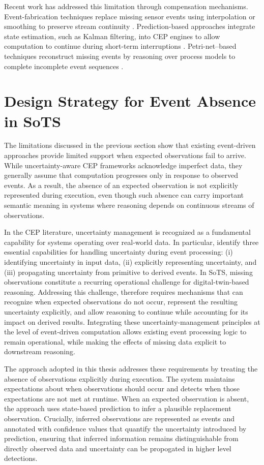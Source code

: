 Recent work has addressed this limitation through compensation mechanisms. Event-fabrication techniques replace missing sensor events using interpolation or smoothing to preserve stream continuity \citep{gkoulis2025assessing}. Prediction-based approaches integrate state estimation, such as Kalman filtering, into CEP engines to allow computation to continue during short-term interruptions \citep{vijayakumar2009missing}. Petri-net--based techniques reconstruct missing events by reasoning over process models to complete incomplete event sequences \citep{wang2013efficient}.


\section{Design Strategy for Event Absence in SoTS}
The limitations discussed in the previous section show that existing event-driven approaches provide limited support when expected observations fail to arrive. While uncertainty-aware CEP frameworks acknowledge imperfect data, they generally assume that computation progresses only in response to observed events. As a result, the absence of an expected observation is not explicitly represented during execution, even though such absence can carry important semantic meaning in systems where reasoning depends on continuous streams of observations.

In the CEP literature, uncertainty management is recognized as a fundamental capability for systems operating over real-world data. In particular, \citet{cugola2015complex} identify three essential capabilities for handling uncertainty during event processing: (i) identifying uncertainty in input data, (ii) explicitly representing uncertainty, and (iii) propagating uncertainty from primitive to derived events. In SoTS, missing observations constitute a recurring operational challenge for digital-twin-based reasoning. Addressing this challenge, therefore requires mechanisms that can recognize when expected observations do not occur, represent the resulting uncertainty explicitly, and allow reasoning to continue while accounting for its impact on derived results. Integrating these uncertainty-management principles at the level of event-driven computation allows existing event processing logic to remain operational, while making the effects of missing data explicit to downstream reasoning.


The approach adopted in this thesis addresses these requirements by treating the absence of observations explicitly during execution. The system maintains expectations about when observations should occur and detects when those expectations are not met at runtime. When an expected observation is absent, the approach uses state-based prediction to infer a plausible replacement observation. Crucially, inferred observations are represented as events and annotated with confidence values that quantify the uncertainty introduced by prediction, ensuring that inferred information remains distinguishable from directly observed data and uncertainty can be propogated in higher level detections.

